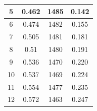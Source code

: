 \documentclass[a4paper,12pt]{article}
\begin{document}
\begin{table}[H]
\begin{subtable}[t]{0.45\textwidth}
\begin{tabular}{|c|c|c|c|}
			5                                                            & 0.462                                                                           & 1485                                                                 & 0.142                                                                \\ \hline
			6                                                            & 0.474                                                                           & 1482                                                                 & 0.155                                                                \\ \hline
			7                                                            & 0.505                                                                           & 1481                                                                 & 0.181                                                                \\ \hline
			8                                                            & 0.51                                                                            & 1480                                                                 & 0.191                                                                \\ \hline
			9                                                            & 0.536                                                                           & 1470                                                                 & 0.220                                                                \\ \hline
			10                                                           & 0.537                                                                           & 1469                                                                 & 0.224                                                                \\ \hline
			11                                                           & 0.554                                                                           & 1477                                                                 & 0.235                                                                \\ \hline
			12                                                           & 0.572                                                                           & 1463                                                                 & 0.247                                                                \\ \hline

\end{tabular}
\end{subtable}
\end{table}
\end{document}
